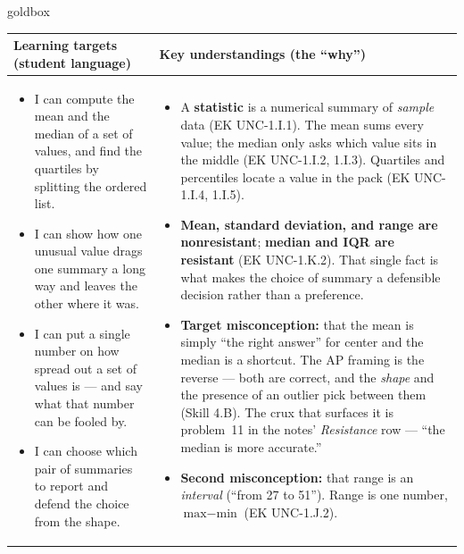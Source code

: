 \documentclass[10pt]{article}
\begin{document}
\renewcommand{\arraystretch}{1.4}
\boxguard
\begin{skillbox}{goldbox}
\begin{tabularx}{\linewidth}{@{}X|X@{}}
\textbf{Learning targets (student language)} & \textbf{Key understandings (the ``why'')} \\[2pt]
\hline
\vspace{-6pt}
\begin{itemize}[leftmargin=1.1em, nosep, after=\vspace{2pt}]
  \item I can compute the mean and the median of a set of values, and find the quartiles by
        splitting the ordered list.
  \item I can show how one unusual value drags one summary a long way and leaves the other
        where it was.
  \item I can put a single number on how spread out a set of values is --- and say what that
        number can be fooled by.
  \item I can choose which pair of summaries to report and defend the choice from the shape.
\end{itemize}
&
\vspace{-6pt}
\begin{itemize}[leftmargin=1.1em, nosep, after=\vspace{2pt}]
  \item A \textbf{statistic} is a numerical summary of \emph{sample} data (EK UNC-1.I.1). The
        mean sums every value; the median only asks which value sits in the middle
        (EK UNC-1.I.2, 1.I.3). Quartiles and percentiles locate a value in the pack
        (EK UNC-1.I.4, 1.I.5).
  \item \textbf{Mean, standard deviation, and range are nonresistant}; \textbf{median and IQR
        are resistant} (EK UNC-1.K.2). That single fact is what makes the choice of summary a
        defensible decision rather than a preference.
  \item \textbf{Target misconception:} that the mean is simply ``the right answer'' for center
        and the median is a shortcut. The AP framing is the reverse --- both are correct, and
        the \emph{shape} and the presence of an outlier pick between them (Skill 4.B). The
        crux that surfaces it is problem~11 in the notes' \emph{Resistance} row --- ``the median
        is more accurate.''
  \item \textbf{Second misconception:} that range is an \emph{interval} (``from 27 to 51'').
        Range is one number, $\text{max} - \text{min}$ (EK UNC-1.J.2).
\end{itemize}
\end{tabularx}
\end{skillbox}
\end{document}
